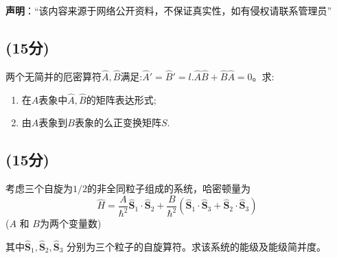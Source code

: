 
\textbf{声明}：“该内容来源于网络公开资料，不保证真实性，如有侵权请联系管理员”

\subsection{(15分)}
两个无简并的厄密算符$\hat{A},\hat{B}$满足:$\hat{A}'=\hat{B}'=l$.$\hat{A}\hat{B}+\hat{B}\hat{A}=0$。求:
\begin{enumerate}
\item 在$A$表象中$\hat{A},\hat{B}$的矩阵表达形式;
\item 由$A$表象到$B$表象的么正变换矩阵$S$.
\end{enumerate}
\subsection{(15分)}
考虑三个自旋为$1/2$的非全同粒子组成的系统，哈密顿量为$$\hat{H} = \frac{A}{\hbar^2} \hat{\mathbf{S}}_1 \cdot \hat{\mathbf{S}}_2 + \frac{B}{\hbar^2} (\hat{\mathbf{S}}_1 \cdot \hat{\mathbf{S}}_3 + \hat{\mathbf{S}}_2 \cdot \hat{\mathbf{S}}_3)~$$ ($A$ 和 $B$为两个变量数)

其中$\hat{\mathbf{S}}_1, \hat{\mathbf{S}}_2, \hat{\mathbf{S}}_3$ 分别为三个粒子的自旋算符。求该系统的能级及能级简并度。